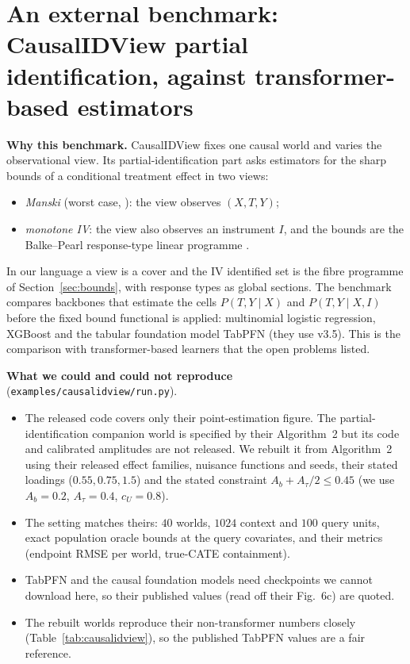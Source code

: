 \documentclass[11pt]{article}
\theoremstyle{definition}
\theoremstyle{remark}
\begin{document}
\section{An external benchmark: CausalIDView partial identification, against transformer-based estimators}\label{sec:causalidview}
\textbf{Why this benchmark.} CausalIDView \cite{causalidview} fixes one causal world and varies the observational view. Its partial-identification part asks estimators for the sharp bounds of a conditional treatment effect in two views:
\begin{itemize}
  \item \emph{Manski} (worst case, \cite{manski03}): the view observes $(X,T,Y)$;
  \item \emph{monotone IV}: the view also observes an instrument $I$, and the bounds are the Balke--Pearl response-type linear programme \cite{balkepearl97}.
\end{itemize}
In our language a view is a cover and the IV identified set is the fibre programme of Section~\ref{sec:bounds}, with response types as global sections. The benchmark compares backbones that estimate the cells $P(T,Y\mid X)$ and $P(T,Y\mid X,I)$ before the fixed bound functional is applied: multinomial logistic regression, XGBoost \cite{xgboost} and the tabular foundation model TabPFN \cite{tabpfn} (they use v3.5). This is the comparison with transformer-based learners that the open problems listed.

\textbf{What we could and could not reproduce} (\texttt{examples/causalidview/run.py}).
\begin{itemize}
  \item The released code covers only their point-estimation figure. The partial-identification companion world is specified by their Algorithm~2 but its code and calibrated amplitudes are not released. We rebuilt it from Algorithm~2 using their released effect families, nuisance functions and seeds, their stated loadings ($0.55,0.75,1.5$) and the stated constraint $A_b+A_\tau/2\le0.45$ (we use $A_b=0.2$, $A_\tau=0.4$, $c_U=0.8$).
  \item The setting matches theirs: $40$ worlds, $1024$ context and $100$ query units, exact population oracle bounds at the query covariates, and their metrics (endpoint RMSE per world, true-CATE containment).
  \item TabPFN and the causal foundation models need checkpoints we cannot download here, so their published values (read off their Fig.~6c) are quoted.
  \item The rebuilt worlds reproduce their non-transformer numbers closely (Table~\ref{tab:causalidview}), so the published TabPFN values are a fair reference.
\end{itemize}
\end{document}

